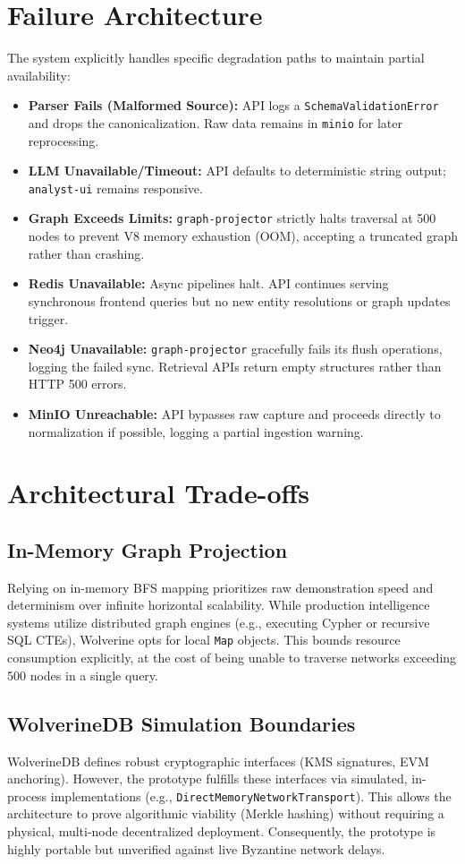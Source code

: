 \section{Failure Architecture}
\label{sec:arch-failure}
The system explicitly handles specific degradation paths to maintain partial availability:
\begin{itemize}
    \item \textbf{Parser Fails (Malformed Source):} API logs a \texttt{SchemaValidationError} and drops the canonicalization. Raw data remains in \texttt{minio} for later reprocessing.
    \item \textbf{LLM Unavailable/Timeout:} API defaults to deterministic string output; \texttt{analyst-ui} remains responsive.
    \item \textbf{Graph Exceeds Limits:} \texttt{graph-projector} strictly halts traversal at 500 nodes to prevent V8 memory exhaustion (OOM), accepting a truncated graph rather than crashing.
    \item \textbf{Redis Unavailable:} Async pipelines halt. API continues serving synchronous frontend queries but no new entity resolutions or graph updates trigger.
    \item \textbf{Neo4j Unavailable:} \texttt{graph-projector} gracefully fails its flush operations, logging the failed sync. Retrieval APIs return empty structures rather than HTTP 500 errors.
    \item \textbf{MinIO Unreachable:} API bypasses raw capture and proceeds directly to normalization if possible, logging a partial ingestion warning.
\end{itemize}

\section{Architectural Trade-offs}
\label{sec:arch-tradeoffs}
\subsection{In-Memory Graph Projection}
Relying on in-memory BFS mapping prioritizes raw demonstration speed and determinism over infinite horizontal scalability. While production intelligence systems utilize distributed graph engines (e.g., executing Cypher or recursive SQL CTEs), Wolverine opts for local \texttt{Map} objects. This bounds resource consumption explicitly, at the cost of being unable to traverse networks exceeding 500 nodes in a single query.

\subsection{WolverineDB Simulation Boundaries}
WolverineDB defines robust cryptographic interfaces (KMS signatures, EVM anchoring). However, the prototype fulfills these interfaces via simulated, in-process implementations (e.g., \texttt{DirectMemoryNetworkTransport}). This allows the architecture to prove algorithmic viability (Merkle hashing) without requiring a physical, multi-node decentralized deployment. Consequently, the prototype is highly portable but unverified against live Byzantine network delays.

